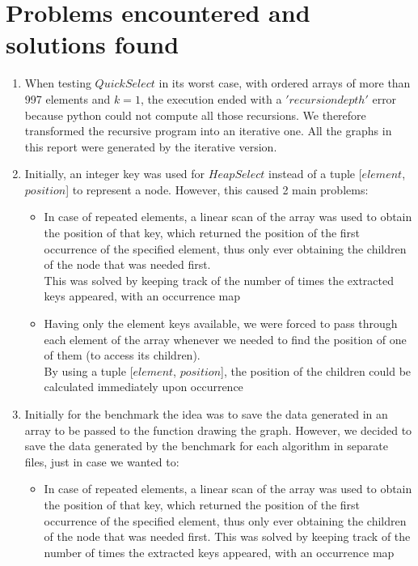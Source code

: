 \documentclass{article}
\begin{document}
\section{Problems encountered and solutions found}
\begin{enumerate}
    \item When testing $QuickSelect$ in its worst case, with ordered arrays of more than 997 elements and $k=1$, the execution ended with a $'recursion depth'$ error because python could not compute all those recursions. We therefore transformed the recursive program into an iterative one. All the graphs in this report were generated by the iterative version.
    \item Initially, an integer key was used for $HeapSelect$ instead of a tuple [$element$, $position$] to represent a node. However, this caused 2 main problems:
    \begin{itemize}
        \item In case of repeated elements, a linear scan of the array was used to obtain the position of that key, which returned the position of the first occurrence of the specified element, thus only ever obtaining the children of the node that was needed first.\\
        This was solved by keeping track of the number of times the extracted keys appeared, with an occurrence map
        \item Having only the element keys available, we were forced to pass through each element of the array whenever we needed to find the position of one of them (to access its children).\\
        By using a tuple [$element$, $position$], the position of the children could be calculated immediately upon occurrence
    \end{itemize}
    \item Initially for the benchmark the idea was to save the data generated in an array to be passed to the function drawing the graph. However, we decided to save the data generated by the benchmark for each algorithm in separate files, just in case we wanted to:
    \begin{itemize}
        \item In case of repeated elements, a linear scan of the array was used to obtain the position of that key, which returned the position of the first occurrence of the specified element, thus only ever obtaining the children of the node that was needed first. This was solved by keeping track of the number of times the extracted keys appeared, with an occurrence map

\end{itemize}
\end{enumerate}
\end{document}
